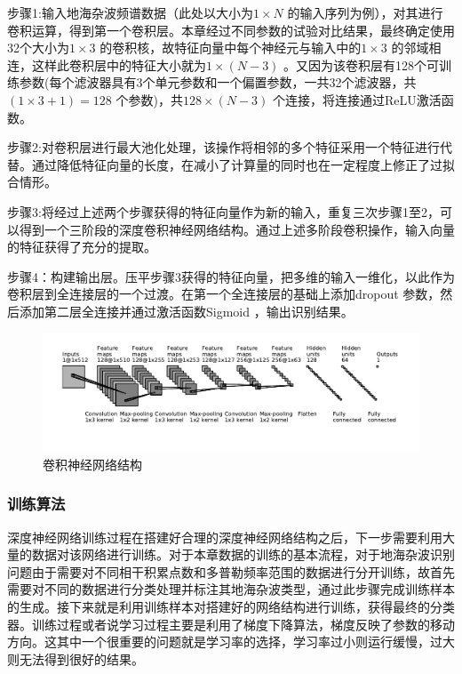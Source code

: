 步骤1:输入地海杂波频谱数据（此处以大小为$1\times N$ 的输入序列为例），对其进行卷积运算，得到第一个卷积层。本章经过不同参数的试验对比结果，最终确定使用32个大小为$1\times 3$ 的卷积核，故特征向量中每个神经元与输入中的$1\times 3$ 的邻域相连，这样此卷积层中的特征大小就为$1\times (N-3)$ 。又因为该卷积层有128个可训练参数(每个滤波器具有3个单元参数和一个偏置参数，一共32个滤波器，共$(1\times 3 + 1) = 128$ 个参数)，共$128\times(N-3)$ 个连接，将连接通过ReLU激活函数。

步骤2:对卷积层进行最大池化处理，该操作将相邻的多个特征采用一个特征进行代替。通过降低特征向量的长度，在减小了计算量的同时也在一定程度上修正了过拟合情形。

步骤3:将经过上述两个步骤获得的特征向量作为新的输入，重复三次步骤1至2，可以得到一个三阶段的深度卷积神经网络结构。通过上述多阶段卷积操作，输入向量的特征获得了充分的提取。

步骤4：构建输出层。压平步骤3获得的特征向量，把多维的输入一维化，以此作为卷积层到全连接层的一个过渡。在第一个全连接层的基础上添加dropout 参数，然后添加第二层全连接并通过激活函数Sigmoid ，输出识别结果。

\begin{figure}[hbt]
	\centering
	\includegraphics[width=13.5cm]{figures/othr/struct}
	\caption{卷积神经网络结构}
	\label{fig:struct}
\end{figure}

\subsubsection{训练算法}

深度神经网络训练过程在搭建好合理的深度神经网络结构之后，下一步需要利用大量的数据对该网络进行训练。对于本章数据的训练的基本流程，对于地海杂波识别问题由于需要对不同相干积累点数和多普勒频率范围的数据进行分开训练，故首先需要对不同的数据进行分类处理并标注其地海杂波类型，通过此步骤完成训练样本的生成。接下来就是利用训练样本对搭建好的网络结构进行训练，获得最终的分类器。训练过程或者说学习过程主要是利用了梯度下降算法，梯度反映了参数的移动方向。这其中一个很重要的问题就是学习率的选择，学习率过小则运行缓慢，过大则无法得到很好的结果。

